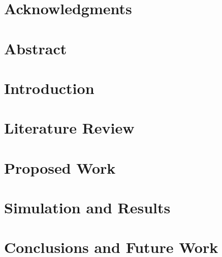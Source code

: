 \documentclass[a4paper, 11pt, oneside]{Dissertation}
\begin{document}
\sloppy
{}







\chapter*{Acknowledgments}
\label{ch:ack}


\chapter*{Abstract}
\label{ch:abs}


\pagestyle{fancy}
\tableofcontents
\listoffigures
\listoftables
\newpage

\mainmatter

\chapter{Introduction}
\label{ch:intro}


\chapter{Literature Review}
\label{ch:literature}


\chapter{Proposed Work}
\label{ch:new}


\chapter{Simulation and Results}
\label{ch:result}


\chapter{Conclusions and Future Work}
\label{ch:conclude}


\newpage
{}
\small{{}}

\end{document}
